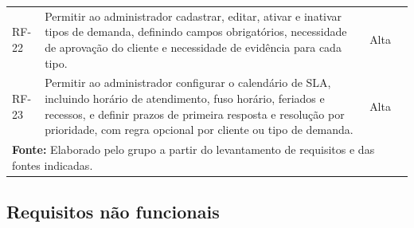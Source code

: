 \begin{longtable}{p{}p{}p{}p{}}
RF-22 & Permitir ao administrador cadastrar, editar, ativar e inativar tipos de demanda, definindo campos obrigatórios, necessidade de aprovação do cliente e necessidade de evidência para cada tipo. & Alta & \cite{servicerequest2020,iso29148} \\
RF-23 & Permitir ao administrador configurar o calendário de SLA, incluindo horário de atendimento, fuso horário, feriados e recessos, e definir prazos de primeira resposta e resolução por prioridade, com regra opcional por cliente ou tipo de demanda. & Alta & \cite{servicedesk2023} \\
\hline
\multicolumn{4}{l}{\footnotesize\textbf{Fonte:} Elaborado pelo grupo a partir do levantamento de requisitos e das fontes indicadas.}
\end{longtable}

\subsection{Requisitos não funcionais}


